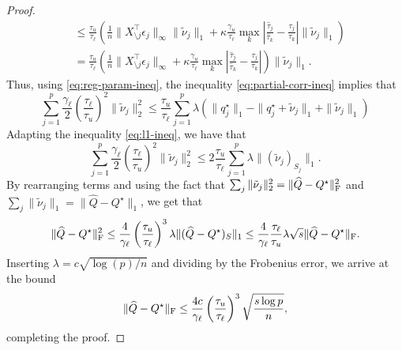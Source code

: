 \documentclass{article}
\begin{document}
\begin{proof}
\[\begin{aligned}
            &\leq \frac{\tau_u}{\tau_\ell} \left(\frac{1}{n}\|X_{\setminus j}^\top \epsilon_j\|_\infty \|\tilde \nu_j\|_1 + \kappa \frac{\gamma_u}{\tau_\ell} \max_k \left|\frac{\hat \tau_j}{\hat \tau_k} - \frac{\tau_j}{\tau_k}\right| \|\tilde \nu_j\|_1 \right) \\
            &= \frac{\tau_u}{\tau_\ell} \left(\frac{1}{n}\|X_{\setminus j}^\top \epsilon_j\|_\infty + \kappa \frac{\gamma_u}{\tau_\ell} \max_k \left|\frac{\hat \tau_j}{\hat \tau_k} - \frac{\tau_j}{\tau_k}\right| \right) \|\tilde \nu_j\|_1. 
    \end{aligned}
\]
Thus, using \eqref{eq:reg-param-ineq}, the inequality
\eqref{eq:partial-corr-ineq} implies that
\[
    \sum_{j=1}^{p} \frac{\gamma_\ell}{2} \left(\frac{\tau_\ell}{\tau_u}\right)^2 \|\tilde \nu_j\|_2^2 \leq \frac{\tau_u}{\tau_\ell} \sum_{j=1}^{p} \lambda (\| q^\star_j\|_1 - \|q^\star_j + \tilde \nu_j\|_1 + \|\tilde \nu_j\|_1)
\]
Adapting the inequality \eqref{eq:l1-ineq}, we have that
\[
    \sum_{j=1}^{p} \frac{\gamma_\ell}{2} \left(\frac{\tau_\ell}{\tau_u}\right)^2 \|\tilde \nu_j\|_2^2 \leq 2\frac{\tau_u}{\tau_\ell} \sum_{j=1}^{p} \lambda \|(\tilde \nu_j)_{S_j}\|_1.
\]
By rearranging terms and using the fact that $\sum_j \|\tilde \nu_j\|_2^2 =
\|\widehat{Q} - Q^\star\|_{\rm F}^2$ and $\sum_j \|\tilde \nu_j\|_1 = \|\widehat{Q} -
Q^\star\|_1$, we get that 
\[
    \|\widehat{Q} - Q^\star\|_{\rm F}^2 \leq \frac{4}{\gamma_\ell} \left(\frac{\tau_u}{\tau_\ell}\right)^3 \lambda \|(\widehat{Q} - Q^\star)_S\|_1 \leq \frac{4}{\gamma_\ell} \frac{\tau_\ell}{\tau_u} \lambda \sqrt{s} \|\widehat{Q} - Q^\star\|_{\rm F}.  
\]
Inserting $\lambda = c\sqrt{\log(p)/n}$ and dividing by the Frobenius error, we
arrive at the bound
\[
    \|\widehat{Q} - Q^\star\|_{\rm F} \leq \frac{4c}{\gamma_\ell} \left(\frac{\tau_u}{\tau_\ell}\right)^3 \sqrt{\frac{s\log p}{n}},
\]
completing the proof. \end{proof}
\end{document}
